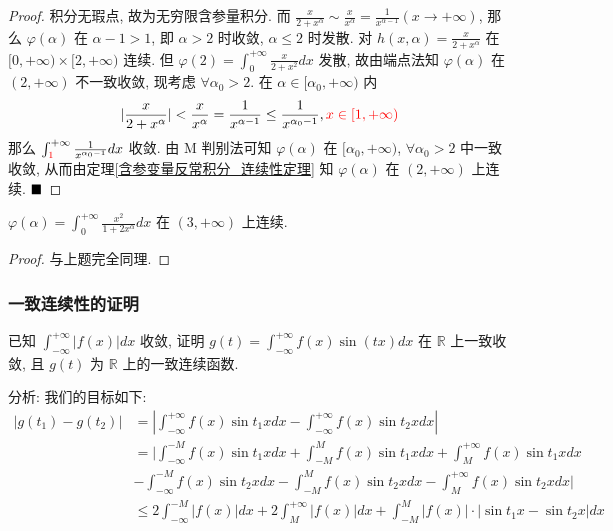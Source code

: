 \documentclass[lang=cn,newtx,10pt,scheme=chinese]{elegantbook}
\begin{document}
\begin{proof}
积分无瑕点, 故为无穷限含参量积分.
而 $\frac{x}{2+x^\alpha} \sim \frac{x}{x^\alpha} = \frac{1}{x^{\alpha-1}} (x \to +\infty)$, 那么 $\varphi(\alpha)$ 在 $\alpha-1>1$, 即 $\alpha>2$ 时收敛, $\alpha \le 2$ 时发散.
对 $h(x,\alpha) = \frac{x}{2+x^\alpha}$ 在 $[0, +\infty) \times [2, +\infty)$ 连续. 但 $\varphi(2) = \int_0^{+\infty} \frac{x}{2+x^2}dx$ 发散, 故由端点法知 $\varphi(\alpha)$ 在 $(2, +\infty)$ 不一致收敛, 现考虑 $\forall \alpha_0 > 2$. 在 $\alpha \in [\alpha_0, +\infty)$ 内
$$|\frac{x}{2+x^\alpha}| < \frac{x}{x^\alpha} = \frac{1}{x^{\alpha-1}} \le \frac{1}{x^{\alpha_0-1}}, \textcolor{red}{x \in [1, +\infty)}$$
那么 $\int_{\textcolor{red}{1}}^{+\infty} \frac{1}{x^{\alpha_0-1}}dx$ 收敛. 由 M 判别法可知
$\varphi(\alpha)$ 在 $[\alpha_0, +\infty)$, $\forall \alpha_0>2$ 中一致收敛, 从而由定理\ref{含参变量反常积分_连续性定理} 知
$\varphi(\alpha)$ 在 $(2, +\infty)$ 上连续.
$\hfill \blacksquare$
\end{proof}

\begin{problem}
$\varphi(\alpha) = \int_{0}^{+\infty} \frac{x^2}{1+2x^\alpha} dx$ 在 $(3, +\infty)$ 上连续.
\end{problem}
\begin{proof}
    与上题完全同理.
\end{proof}
\subsubsection*{一致连续性的证明}
\begin{example}
已知 $\int_{-\infty}^{+\infty} |f(x)| dx$ 收敛, 证明 $g(t) = \int_{-\infty}^{+\infty} f(x) \sin(tx) dx$ 在 $\mathbb{R}$ 上一致收敛, 且 $g(t)$ 为 $\mathbb{R}$ 上的一致连续函数.
\end{example}

\begin{remark}
分析: 我们的目标如下:
\begin{align*}
 |g(t_1) - g(t_2)| &= |\int_{-\infty}^{+\infty} f(x)\sin t_1x dx - \int_{-\infty}^{+\infty} f(x)\sin t_2x dx| \\
& = |\int_{-\infty}^{-M} f(x)\sin t_1x dx + \int_{-M}^{M} f(x)\sin t_1x dx + \int_{M}^{+\infty} f(x)\sin t_1x dx \\
&- \int_{-\infty}^{-M} f(x)\sin t_2x dx - \int_{-M}^{M} f(x)\sin t_2x dx - \int_{M}^{+\infty} f(x)\sin t_2x dx| \\
& \le 2\int_{-\infty}^{-M} |f(x)|dx + 2\int_{M}^{+\infty} |f(x)|dx + \int_{-M}^{M} |f(x)| \cdot |\sin t_1x - \sin t_2x| dx 
\end{align*}
\end{remark}
\end{document}
